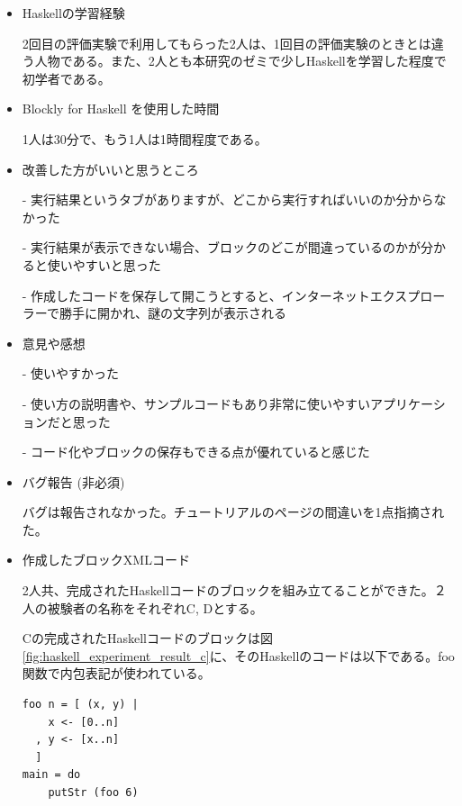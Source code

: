 \documentclass{risepaper}
\begin{document}
\begin{itemize}
\item Haskellの学習経験

2回目の評価実験で利用してもらった2人は、1回目の評価実験のときとは違う人物である。また、2人とも本研究のゼミで少しHaskellを学習した程度で初学者である。

\item Blockly for Haskell を使用した時間

1人は30分で、もう1人は1時間程度である。

\item 改善した方がいいと思うところ

- 実行結果というタブがありますが、どこから実行すればいいのか分からなかった

- 実行結果が表示できない場合、ブロックのどこが間違っているのかが分かると使いやすいと思った

- 作成したコードを保存して開こうとすると、インターネットエクスプローラーで勝手に開かれ、謎の文字列が表示される

\item 意見や感想

- 使いやすかった

- 使い方の説明書や、サンプルコードもあり非常に使いやすいアプリケーションだと思った

- コード化やブロックの保存もできる点が優れていると感じた

\item バグ報告 (非必須)

バグは報告されなかった。チュートリアルのページの間違いを1点指摘された。

\item 作成したブロックXMLコード

2人共、完成されたHaskellコードのブロックを組み立てることができた。２人の被験者の名称をそれぞれC, Dとする。

Cの完成されたHaskellコードのブロックは図\ref{fig:haskell_experiment_result_c}に、そのHaskellのコードは以下である。foo関数で内包表記が使われている。
\begin{lstlisting}[basicstyle=\ttfamily\footnotesize]
foo n = [ (x, y) |
    x <- [0..n]
  , y <- [x..n]
  ]
main = do
    putStr (foo 6)
\end{lstlisting}


\end{itemize}
\end{document}

